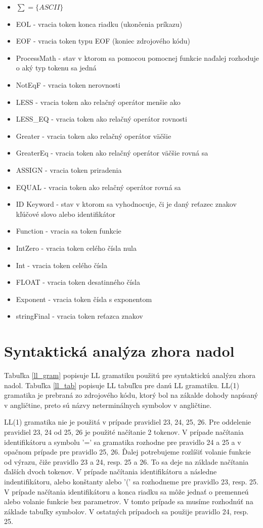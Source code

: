 \documentclass[a4paper, 11pt]{article}
\begin{document}
\begin{itemize}
\item $\sum = \{ASCII\}$
\item EOL - vracia token konca riadku (ukončenia príkazu)
\item EOF - vracia token typu EOF (koniec zdrojového kódu)
\item ProcessMath - stav v ktorom sa pomocou pomocnej funkcie naďalej rozhoduje o aký typ tokenu sa jedná
\item NotEqF - vracia token nerovnosti 
\item LESS - vracia token ako relačný operátor menšie ako
\item LESS\_EQ - vracia token ako relačný operátor rovnosti
\item Greater - vracia token ako relačný operátor väčšie
\item GreaterEq - vracia token ako relačný operátor väčšie rovná sa
\item ASSIGN - vracia token priradenia
\item EQUAL - vracia token ako relačný operátor rovná sa
\item ID Keyword - stav v ktorom sa vyhodnocuje, či je daný reťazec znakov kľúčové slovo alebo identifikátor
\item Function - vracia sa token funkcie
\item IntZero - vracia token celého čísla nula
\item Int - vracia token celého čísla 
\item FLOAT - vracia token desatinného čísla
\item Exponent - vracia token čísla s exponentom
\item stringFinal - vracia token reťazca znakov

\end{itemize}
\newpage

\section{Syntaktická analýza zhora nadol}
Tabuľka \ref{ll_gram} popisuje LL gramatiku použitú pre syntaktickú analýzu zhora nadol. Tabuľka \ref{ll_tab} popisuje LL tabuľku pre danú LL gramatiku.
LL(1) gramatika je prebraná zo zdrojového kódu, ktorý bol na zákalde dohody napísaný v angličtine, preto sú názvy neterminálnych
symbolov v angličtine.

LL(1) gramatika nie je použitá v prípade pravidiel 23, 24, 25, 26. Pre oddelenie pravidiel 23, 24 od 25, 26 je použité
načítanie 2 tokenov. V prípade načítania identifikátoru a symbolu '=' sa gramatika rozhodne pre pravidlo 24 a 25 a v opačnom
prípade pre pravidlo 25, 26. Ďalej potrebujeme rozlíšiť volanie funkcie od výrazu, čiže pravidlo 23 a 24, resp. 25 a 26.
To sa deje na základe načítania ďalších dvoch tokenov. V prípade načítania identifikátoru a následne indentifikátoru, alebo
konštanty alebo '(' sa rozhodneme pre pravidlo 23, resp. 25. V prípade načítania identifikátoru a konca riadku sa môže
jednať o premenneú alebo volanie funkcie bez parametrov. V tomto prípade sa musíme rozhodnúť na základe tabuľky symbolov.
V ostatných prípadoch sa použije pravidlo 24, resp. 25.
\end{document}
